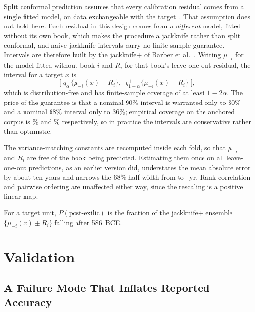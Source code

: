 \documentclass[10pt,letterpaper]{article}
\begin{document}
Split conformal prediction assumes that every calibration residual comes from a
single fitted model, on data exchangeable with the target~\cite{Vovk2005,Lei2018}.
That assumption does not hold here.  Each residual in this design comes from a
\emph{different} model, fitted without its own book, which makes the procedure
a jackknife rather than split conformal, and naive jackknife intervals carry no
finite-sample guarantee.  Intervals are therefore built by the jackknife+ of
Barber et al.~\cite{Barber2021}.  Writing $\mu_{-i}$ for the model fitted
without book $i$ and $R_i$ for that book's leave-one-out residual, the interval
for a target $x$ is
\begin{equation}
\Big[\; q^{-}_{\alpha}\{\mu_{-i}(x) - R_i\},\;\;
        q^{+}_{1-\alpha}\{\mu_{-i}(x) + R_i\} \;\Big],
\end{equation}
which is distribution-free and has finite-sample coverage of at least
$1-2\alpha$.  The price of the guarantee is that a nominal 90\% interval is
warranted only to 80\% and a nominal 68\% interval only to 36\%; empirical
coverage on the anchored corpus is \covsixeight\% and \covninety\%
respectively, so in practice the intervals are conservative rather than
optimistic.

The variance-matching constants are recomputed inside each fold, so that
$\mu_{-i}$ and $R_i$ are free of the book being predicted.  Estimating them
once on all \HBbooks{} leave-one-out predictions, as an earlier version did,
understates the mean absolute error by about ten years and narrows the
68\% half-width from \qnestedsixeight{} to \HBqsixeight~yr.  Rank correlation
and pairwise ordering are unaffected either way, since the rescaling is a
positive linear map.

For a target unit, $P(\text{post-exilic})$ is the fraction of the jackknife+
ensemble $\{\mu_{-i}(x) \pm R_i\}$ falling after 586~BCE.

\section*{Validation}
\label{sec:validation}

\subsection*{A Failure Mode That Inflates Reported Accuracy}
\end{document}
